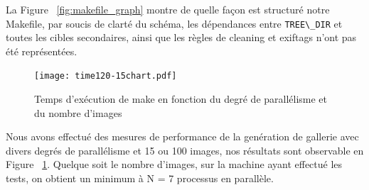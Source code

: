 \documentclass{article}
\begin{document}
La Figure ~\ref{fig:makefile_graph} montre de quelle façon est
structuré notre Makefile, par soucis de clarté du schéma, les dépendances entre
\lstinline!TREE\_DIR! et toutes les cibles secondaires, ainsi que les
règles de cleaning et exiftags n'ont pas été représentées.

\begin{figure}[!h]
\begin{center}
  \texttt{[image: time120-15chart.pdf]}
  \caption{Temps d'exécution de make en fonction du degré de
    parallélisme et du nombre d'images}
\end{center}
\label{fig:time_graph}
\end{figure}

Nous avons effectué des mesures de performance de la genération de
gallerie avec divers degrés de parallélisme et 15 ou 100 images, nos
résultats sont observable en Figure ~\ref{fig:time_graph}. 
Quelque soit le nombre d'images, sur la machine ayant effectué les
tests, on obtient un minimum à N = 7 processus en parallèle.
\end{document}
